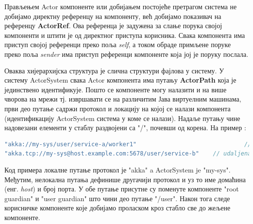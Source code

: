 \documentclass[12pt,oneside]{memoir}
\begin{document}
Прављењем Actor компоненте или добијањем постојеће претрагом система не добијамо директну референцу на компоненту, већ добијамо показивач на референцу \textbf{ActorRef}. Ова референца је задужена за слање порука својој компоненти и штити је од директног приступа корисника. Свака компонента има приступ својој референци преко поља \textit{self}, а током обраде примљене поруке преко поља \textit{sender} има приступ референци компоненте која јој је поруку послала.

Оваква хијерархијска структура је слична структури фајлова у систему. У систему ActorSystem свака Actor компонента има путању \textbf{ActorPath} која је јединствено идентификује. Пошто се компоненте могу налазити и на више чворова на мрежи тј. извршавати се на различитим Јава виртуелним машинама, први део путање садржи протокол и локацију на којој се налази компонента (идентификацију ActorSystem система у коме се налази). Надаље путању чине надовезани елементи у стаблу раздвојени са "/", почевши од корена. На пример \cite{akkaDoc}:
\begin{lstlisting}[language=Scala]
"akka://my-sys/user/service-a/worker1"                  		   	 // lokalna komponenta
"akka.tcp://my-sys@host.example.com:5678/user/service-b" 	// udaljena komponenta
\end{lstlisting}
Код примера локалне путање протокол је "akka" a ActorSystem je "my-sys". Међутим, нелокална путања дефинише другачији протокол и уз то име домаћина (енг. \textit{host}) и број порта. У обе путање присутне су поменуте компоненте "root guardian" и "user guardian" што чини део путање "/user". Након тога следе корисничке компоненте које добијамо проласком кроз стабло све до жељене компоненте.
\end{document}
